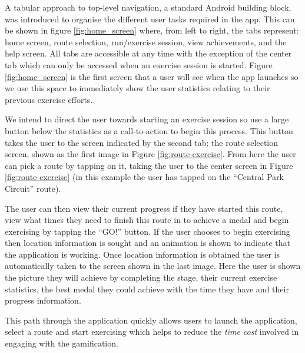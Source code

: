 A tabular approach to top-level navigation, a standard Android building
block\cite{android_tabs}, was introduced to organise the different user
tasks required in the app. This can be shown in figure
\ref{fig:home_screen} where, from left to right, the tabs represent:
home screen, route selection, run/exercise session, view achievements,
and the help screen. All tabs are accessible at any time with the
exception of the center tab which can only be accessed when an
exercise session is started. Figure \ref{fig:home_screen} is the first
screen that a user will see when the app launches so we use this space
to immediately show the user statistics relating to their previous
exercise efforts.

We intend to direct the user towards starting an exercise session so
use  a large button below the statistics as a call-to-action to begin
this process. This button takes the user to the screen indicated by
the second tab: the route selection screen, shown as the first image
in Figure \ref{fig:route-exercise}. From here the user can pick a
route by tapping on it, taking the user to the center
screen in Figure \ref{fig:route-exercise} (in this example the user
has tapped on the ``Central Park Circuit'' route). 

The user can then view their current progress if they have started
this route, view what times they need to finish this route in to
achieve a medal and begin exercising by tapping the ``GO!''
button. If the user chooses to begin exercising then location
information is sought and an animation is shown to indicate that the
application is working. Once location information is obtained the user
is automatically taken to the screen shown in the last image. Here the
user is shown the picture they will achieve by completing the stage,
their current exercise statistics, the best medal they could achieve
with the time they have and their progress information. 

This path through the application quickly allows users to launch the
application, select a route and start exercising which helps to reduce
the \emph{time cost} involved in engaging with the gamification. 

